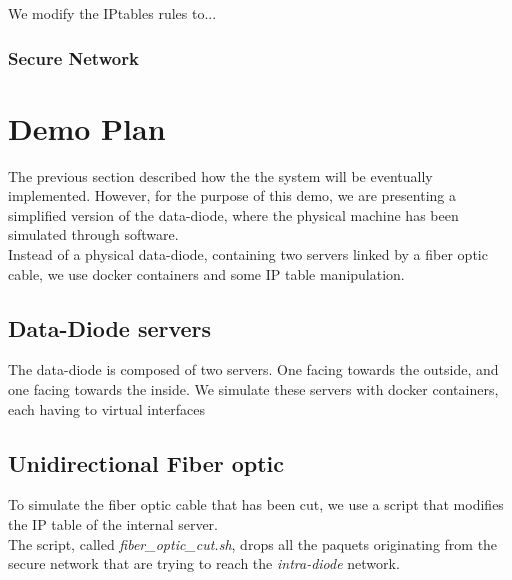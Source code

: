 \documentclass[a4paper,11pt]{article}
\begin{document}
We modify the IPtables rules to...

\subsubsection{Secure Network}

\section{Demo Plan}
The previous section described how the the system will be eventually implemented. However, for the purpose of this demo, we are presenting a simplified version of the data-diode, where the physical machine has been simulated through software.\\

Instead of a physical data-diode, containing two servers linked by a fiber optic cable, we use docker containers and some IP table manipulation.

\subsection{Data-Diode servers}
The data-diode is composed of two servers. One facing towards the outside, and one facing towards the inside. We simulate these servers with docker containers, each having to virtual interfaces

\subsection{Unidirectional Fiber optic}
To simulate the fiber optic cable that has been cut, we use a script that modifies the IP table of the internal server.\\

The script, called \textit{fiber\_optic\_cut.sh}, drops all the paquets originating from the secure network that are trying to reach the \textit{intra-diode} network.
\end{document}

